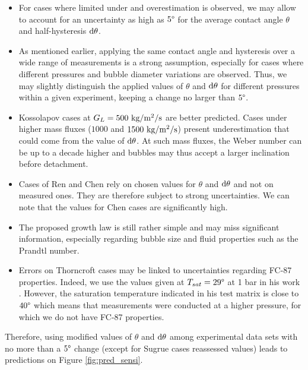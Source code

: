 \begin{itemize}
\item For cases where limited under and overestimation is observed, we may allow to account for an uncertainty as high as $5 \degree$ for the average contact angle $\theta$ and half-hysteresis $\mathrm{d}\theta$.

\item As mentioned earlier, applying the same contact angle and hysteresis over a wide range of measurements is a strong assumption, especially for cases where different pressures and bubble diameter variations are observed. Thus, we may slightly distinguish the applied values of $\theta$ and $\mathrm{d}\theta$ for different pressures within a given experiment, keeping a change no larger than $5 \degree$.

\item Kossolapov cases at $G_{L}=500~\text{kg/m$^{2}$/s}$ are better predicted. Cases under higher mass fluxes ($1000$ and $1500~\text{kg/m$^{2}$/s}$) present underestimation that could come from the value of $\mathrm{d}\theta$. At such mass fluxes, the Weber number can be up to a decade higher and bubbles may thus accept a larger inclination before detachment.

\item Cases of Ren and Chen rely on chosen values for $\theta$ and $\mathrm{d}\theta$ and not on measured ones. They are therefore subject to strong uncertainties. We can note that the values for Chen cases are significantly high.

\item The proposed growth law is still rather simple and may miss significant information, especially regarding bubble size and fluid properties such as the Prandtl number.

\item Errors on Thorncroft cases may be linked to uncertainties regarding FC-87 properties. Indeed, we use the values given at $T_{sat}=29\degree$ at 1 bar in his work \cite{thorncroft_experimental_1998}. However, the saturation temperature indicated in his test matrix is close to $40\degree$ which means that measurements were conducted at a higher pressure, for which we do not have FC-87 properties.


\end{itemize}





Therefore, using modified values of $\theta$ and $\mathrm{d}\theta$ among experimental data sets with no more than a $5 \degree$ change (except for Sugrue cases reassessed values) leads to predictions on Figure \ref{fig:pred_sensi}.






